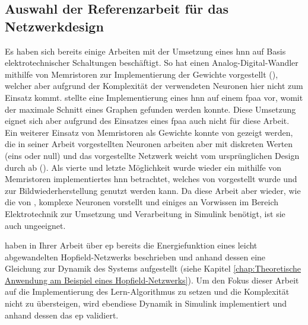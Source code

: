 \subsection{Auswahl der Referenzarbeit für das Netzwerkdesign}
\label{chap:Auswahl der Referenzarbeit für das Netzwerkdesign}

Es haben sich bereits einige Arbeiten mit der Umsetzung eines \ac{hnn} auf Basis elektrotechnischer Schaltungen beschäftigt. So hat \zb \citeauthor{Guo2015} einen Analog-Digital-Wandler mithilfe von Memristoren zur Implementierung der Gewichte vorgestellt (\cite{Guo2015}), welcher aber aufgrund der Komplexität der verwendeten Neuronen hier nicht zum Einsatz kommt. \citeauthor{Mathews2023} stellte \citeyear{Mathews2023} eine Implementierung eines \ac{hnn} auf einem \ac{fpaa} vor, womit der maximale Schnitt eines Graphen gefunden werden konnte. Diese Umsetzung eignet sich aber aufgrund des Einsatzes eines \ac{fpaa} auch nicht für diese Arbeit. Ein weiterer Einsatz von Memristoren als Gewichte konnte von \citeauthor{Hu2015} gezeigt werden, die in seiner Arbeit vorgestellten Neuronen arbeiten aber mit diskreten Werten (eins oder null) und das vorgestellte Netzwerk weicht vom ursprünglichen Design durch \citeauthor{Hopfield1982} ab (\cite{Hu2015}). Als vierte und letzte Möglichkeit wurde wieder ein mithilfe von Memristoren implementiertes \ac{hnn} betrachtet, welches \citeyear{Hong2020} von \citeauthor{Hong2020} vorgestellt wurde und zur Bildwiederherstellung genutzt werden kann. Da diese Arbeit aber wieder, wie die von \cite{Guo2015}, komplexe Neuronen vorstellt und einiges an Vorwissen im Bereich Elektrotechnik zur Umsetzung und Verarbeitung in Simulink benötigt, ist sie auch ungeeignet.

\citeauthor{Scellier2017} haben in Ihrer Arbeit über \ac{ep} bereits die Energiefunktion eines leicht abgewandelten Hopfield-Netzwerks beschrieben und anhand dessen eine Gleichung zur Dynamik des Systems aufgestellt (siehe Kapitel \ref{chap:Theoretische Anwendung am Beispiel eines Hopfield-Netzwerks}). Um den Fokus dieser Arbeit auf die Implementierung des Lern-Algorithmus zu setzen und die Komplexität nicht zu übersteigen, wird ebendiese Dynamik in Simulink implementiert und anhand dessen das \ac{ep} validiert.
